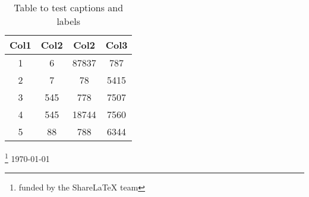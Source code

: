 \documentclass[12pt, letterpaper]{article}
\begin{document}
\begin{table}
\begin{center}
\begin{tabular}{||c c | c c||}
	\hline
	Col1 & Col2 & Col2 & Col3 \\ [0.5ex]
	\hline\hline
	1 & 6 & 87837 & 787 \\
	\hline
	2 & 7 & 78 & 5415 \\
	\hline
	3 & 545 & 778 & 7507 \\
	\hline
	4 & 545 & 18744 & 7560 \\
	\hline
	5 & 88 & 788 & 6344 \\ [1ex]
	\hline
\end{tabular}
\caption{Table to test captions and labels}	%
\label{table:data}	%
\end{center}
\end{table}

\thanks{funded by the ShareLaTeX team}
\today
\end{document}
